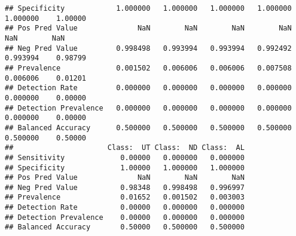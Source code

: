 \documentclass[
]{article}
\begin{document}
\begin{verbatim}
## Specificity            1.000000   1.000000   1.000000   1.000000   1.000000    1.00000
## Pos Pred Value              NaN        NaN        NaN        NaN        NaN        NaN
## Neg Pred Value         0.998498   0.993994   0.993994   0.992492   0.993994    0.98799
## Prevalence             0.001502   0.006006   0.006006   0.007508   0.006006    0.01201
## Detection Rate         0.000000   0.000000   0.000000   0.000000   0.000000    0.00000
## Detection Prevalence   0.000000   0.000000   0.000000   0.000000   0.000000    0.00000
## Balanced Accuracy      0.500000   0.500000   0.500000   0.500000   0.500000    0.50000
##                      Class:  UT Class:  ND Class:  AL
## Sensitivity             0.00000   0.000000   0.000000
## Specificity             1.00000   1.000000   1.000000
## Pos Pred Value              NaN        NaN        NaN
## Neg Pred Value          0.98348   0.998498   0.996997
## Prevalence              0.01652   0.001502   0.003003
## Detection Rate          0.00000   0.000000   0.000000
## Detection Prevalence    0.00000   0.000000   0.000000
## Balanced Accuracy       0.50000   0.500000   0.500000
\end{verbatim}
\end{document}
